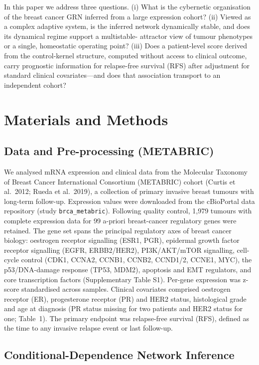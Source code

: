 \documentclass[12pt]{article}
\begin{document}
In this paper we address three questions. (i) What is the cybernetic
organisation of the breast cancer GRN inferred from a large expression
cohort? (ii) Viewed as a complex adaptive system, is the inferred network
dynamically stable, and does its dynamical regime support a multistable-
attractor view of tumour phenotypes or a single, homeostatic operating
point? (iii) Does a patient-level score derived from the control-kernel
structure, computed without access to clinical outcome, carry prognostic
information for relapse-free survival (RFS) after adjustment for standard
clinical covariates---and does that association transport to an independent
cohort?

\section{Materials and Methods}

\subsection{Data and Pre-processing (METABRIC)}

We analysed mRNA expression and clinical data from the Molecular Taxonomy of
Breast Cancer International Consortium (METABRIC) cohort (Curtis et al.\
2012; Rueda et al.\ 2019), a collection of primary invasive breast tumours
with long-term follow-up. Expression values were downloaded from the
cBioPortal data repository (study \texttt{brca\_metabric}). Following
quality control, 1,979 tumours with complete expression data for 99
a-priori breast-cancer regulatory genes were retained. The gene set spans
the principal regulatory axes of breast cancer biology: oestrogen receptor
signalling (ESR1, PGR), epidermal growth factor receptor signalling (EGFR,
ERBB2/HER2), PI3K/AKT/mTOR signalling, cell-cycle control (CDK1, CCNA2, CCNB1, CCNB2,
CCND1/2, CCNE1, MYC), the p53/DNA-damage response (TP53, MDM2), apoptosis
and EMT regulators, and core transcription factors (Supplementary Table
S1).
Per-gene expression was z-score standardised across samples. Clinical
covariates comprised oestrogen receptor (ER), progesterone receptor (PR)
and HER2 status, histological grade and age at diagnosis (PR status missing
for two patients and HER2 status for one; Table~1). The primary endpoint
was relapse-free survival (RFS), defined as the time to any invasive relapse
event or last follow-up.

\subsection{Conditional-Dependence Network Inference}
\end{document}
